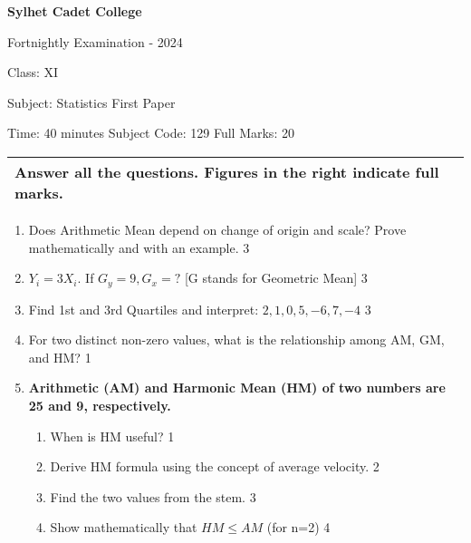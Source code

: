\documentclass[10pt]{article}
\begin{document}
\begin{center}
  \bfseries\large
  Sylhet Cadet College

\normalsize
Fortnightly Examination - 2024

  Class: XI

  Subject: Statistics First Paper

  Time: 40 minutes \qquad \qquad  \qquad \qquad Subject Code: 129  \qquad  \qquad \qquad  \qquad Full Marks: 20

\end{center}

\noindent
\begin{tabular}{p{\dimexpr\linewidth-2\tabcolsep}}
  \textbf{Answer all the questions. Figures in the right indicate full marks.}\\
  \hline
\end{tabular}

\begin{enumerate}

  \item Does Arithmetic Mean depend on change of origin and scale? Prove mathematically and with an example. \hfill 3

 \item $Y_i = 3X_i$. If $G_y = 9, G_x=?$ [G stands for Geometric Mean] \hfill 3
 
 \item Find 1st and 3rd Quartiles and interpret: $2,1,0,5,-6,7,-4$ \hfill 3
 
 \item For two distinct non-zero values, what is the relationship among AM, GM, and HM? \hfill 1
 
\item
	  \textbf{Arithmetic (AM) and Harmonic Mean (HM) of two numbers are 25 and 9, respectively.} 
    \begin{enumerate}
    \item
	When is HM useful? \hfill 1
    \item
	Derive HM formula using the concept of average velocity. \hfill 2
    \item  
	Find the two values from the stem. \hfill 3
    \item
	Show mathematically that $HM \le AM$ (for n=2) \hfill 4
  \end{enumerate}

\end{enumerate}
\end{document}
